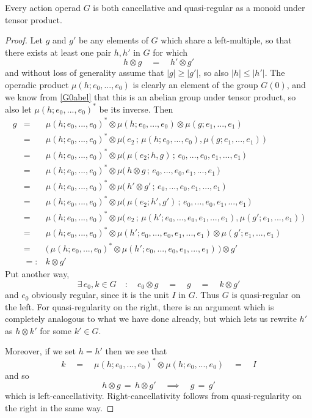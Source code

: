 \documentclass{amsbook} %
\numberwithin{section}{chapter}
\begin{document}
\begin{prop} \label{cqr} Every action operad $G$ is both cancellative and quasi-regular as a monoid under tensor product.
\end{prop}
\begin{proof}
Let $g$ and $g'$ be any elements of $G$ which share a left-multiple, so that there exists at least one pair $h, h'$ in $G$ for which
\[ h \otimes g \quad = \quad h' \otimes g' \]
and without loss of generality assume that $|g| \ge |g'|$, so also $|h| \le |h'|$. The operadic product $\mu(h; e_0, ..., e_0)$ is clearly an element of the group $G(0)$, and we know from \cref{G0abel} that this is an abelian group under tensor product, so also let $\mu(h; e_0, ..., e_0)^*$ be its inverse. Then
\[ \begin{array}{rll}
			g & = & \mu(h; e_0, ..., e_0)^* \otimes \mu(h; e_0, ..., e_0) \otimes \mu(g; e_1, ..., e_1) \\
			& = & \mu(h; e_0, ..., e_0)^* \otimes \mu\big( \, e_2 \, ; \, \mu(h; e_0, ..., e_0), \mu(g; e_1, ..., e_1) \, \big) \\
			& = & \mu(h; e_0, ..., e_0)^* \otimes \mu\big( \, \mu(e_2; h, g) \, ; \, e_0, ..., e_0, e_1, ..., e_1 \, \big) \\
			& = & \mu(h; e_0, ..., e_0)^* \otimes \mu\big( \, h \otimes g \, ; \, e_0, ..., e_0, e_1, ..., e_1 \, \big) \\
			& = & \mu(h; e_0, ..., e_0)^* \otimes \mu\big( \, h' \otimes g' \, ; \, e_0, ..., e_0, e_1, ..., e_1 \, \big) \\
			& = & \mu(h; e_0, ..., e_0)^* \otimes \mu\big( \, \mu(e_2; h', g') \, ; \, e_0, ..., e_0, e_1, ..., e_1 \, \big) \\
			& = & \mu(h; e_0, ..., e_0)^* \otimes \mu\big( \, e_2 \, ; \, \mu(h'; e_0, ..., e_0, e_1, ..., e_1), \mu(g'; e_1, ..., e_1) \, \big) \\
			& = & \mu(h; e_0, ..., e_0)^* \otimes \mu(h'; e_0, ..., e_0, e_1, ..., e_1) \otimes \mu(g'; e_1, ..., e_1) \\
			& = & \big( \, \mu(h; e_0, ..., e_0)^* \otimes \mu(h'; e_0, ..., e_0, e_1, ..., e_1) \, \big) \otimes g' \\
			& =: & k \otimes g'
		\end{array}
\]
Put another way,
\[ \exists \, e_0, k \in G \quad : \quad e_0 \otimes g \quad = \quad g \quad = \quad k \otimes g' \]
and $e_0$ obviously regular, since it is the unit $I$ in $G$. Thus $G$ is quasi-regular on the left.  For quasi-regularity on the right, there is an argument  which is completely analogous to what we have done already, but which lets us rewrite $h'$ as $h \otimes k'$ for some $k' \in G$.

Moreover, if we set $h = h'$ then we see that
\[ k \quad = \quad \mu(h; e_0, ..., e_0)^* \otimes \mu(h; e_0, ..., e_0) \quad = \quad I \]
and so
\[ h \otimes g \, = \, h \otimes g' \quad \implies \quad g \, = \, g'  \]
which is left-cancellativity. Right-cancellativity follows from quasi-regularity on the right in the same way.
\end{proof}
\end{document}
